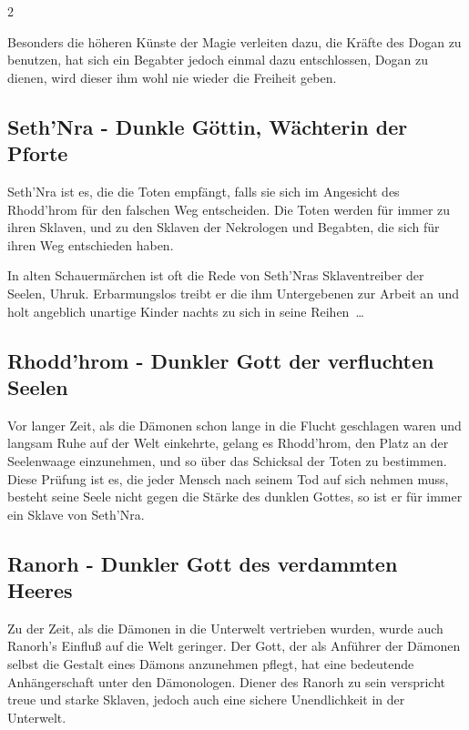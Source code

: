 \begin{multicols}{2}
{Besonders die höheren Künste der Magie verleiten dazu, die Kräfte des Dogan zu benutzen, hat sich ein Begabter jedoch einmal dazu entschlossen, Dogan zu dienen, wird dieser ihm wohl nie wieder die Freiheit geben.

\subsection{Seth'Nra - Dunkle Göttin, Wächterin der Pforte}\label{subsec:sethnra-dunkle-gottin-wachterin-der-pforte}

Seth'Nra ist es, die die Toten empfängt, falls sie sich im Angesicht des Rhodd'hrom für den falschen Weg entscheiden.
Die Toten werden für immer zu ihren Sklaven, und zu den Sklaven der Nekrologen und Begabten, die sich für ihren Weg entschieden haben.

In alten Schauermärchen ist oft die Rede von Seth'Nras Sklaventreiber der Seelen, Uhruk.
Erbarmungslos treibt er die ihm Untergebenen zur Arbeit an und holt angeblich unartige Kinder nachts zu sich in seine Reihen …

\subsection{Rhodd'hrom - Dunkler Gott der verfluchten Seelen}\label{subsec:rhodd'hrom-dunkler-gott-der-verfluchten-seelen}

Vor langer Zeit, als die Dämonen schon lange in die Flucht geschlagen waren und langsam Ruhe auf der Welt einkehrte, gelang es Rhodd'hrom, den Platz an der Seelenwaage einzunehmen, und so über das Schicksal der Toten zu bestimmen.
Diese Prüfung ist es, die jeder Mensch nach seinem Tod auf sich nehmen muss, besteht seine Seele nicht gegen die Stärke des dunklen Gottes, so ist er für immer ein Sklave von Seth'Nra.

\subsection{Ranorh - Dunkler Gott des verdammten Heeres}\label{subsec:ranorh-dunkler-gott-des-verdammten-heeres}

Zu der Zeit, als die Dämonen in die Unterwelt vertrieben wurden, wurde auch Ranorh's Einfluß auf die Welt geringer.
Der Gott, der als Anführer der Dämonen selbst die Gestalt eines Dämons anzunehmen pflegt, hat eine bedeutende Anhängerschaft unter den Dämonologen.
Diener des Ranorh zu sein verspricht treue und starke Sklaven, jedoch auch eine sichere Unendlichkeit in der Unterwelt.

}
\end{multicols}

